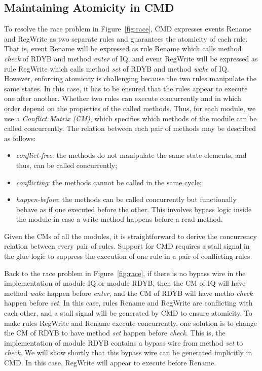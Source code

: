 \documentclass[conference]{IEEEtran}
\begin{document}
\subsection{Maintaining Atomicity in CMD}
To resolve the race problem in Figure~\ref{fig:race}, CMD expresses events Rename and RegWrite as two separate rules and guarantees the atomicity of each rule.
That is, event Rename will be expressed as rule Rename which calls method \emph{check} of RDYB and method \emph{enter} of IQ, and event RegWrite will be expressed as rule RegWrite which calls method \emph{set} of RDYB and method \emph{wake} of IQ.
However, enforcing atomicity is challenging because the two rules manipulate the same states.
In this case, it has to be ensured that the rules appear to execute one after another.
Whether two rules can execute concurrently and in which order depend on the properties of the called methods.
Thus, for each module, we use a \emph{Conflict Matrix (CM)}, which specifies which methods of the module can be called concurrently.
The relation between each pair of methods may be described as follows:
\begin{itemize}
    \item \emph{conflict-free}: the methods do not manipulate the same state elements, and thus, can be called concurrently;
    \item \emph{conflicting}: the methods cannot be called in the same cycle;
    \item \emph{happen-before}: the methods can be called concurrently but functionally behave as if one executed before the other.
    This involves bypass logic inside the module in case a write method happens before a read method.
\end{itemize}
Given the CMs of all the modules, it is straightforward to derive the concurrency relation between every pair of rules.
Support for CMD requires a stall signal in the glue logic to suppress the execution of one rule in a pair of conflicting rules.

Back to the race problem in Figure~\ref{fig:race}, if there is no bypass wire in the implementation of module IQ or module RDYB, then the CM of IQ will have method \emph{wake} happen before \emph{enter}, and the CM of RDYB will have metho \emph{check} happen before \emph{set}.
In this case, rules Rename and RegWrite are conflicting with each other, and a stall signal will be generated by CMD to ensure atomicity.
To make rules RegWrite and Rename execute concurrently, one solution is to change the CM of RDYB to have method \emph{set} happen before \emph{check}.
This is, the implementation of module RDYB contains a bypass wire from method \emph{set} to \emph{check}.
We will show shortly that this bypass wire can be generated implicitly in CMD.
In this case, RegWrite will appear to execute before Rename.
\end{document}
